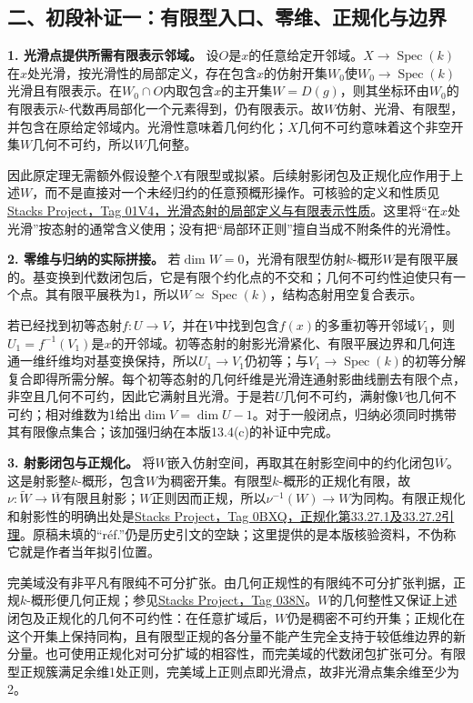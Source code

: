 \documentclass[UTF8,a4paper]{ctexbook}
\DeclareMathOperator{\Spec}{Spec}
\begin{document}
\subsection*{二、初段补证一：有限型入口、零维、正规化与边界}

\noindent\textbf{1. 光滑点提供所需有限表示邻域。}
设$O$是$x$的任意给定开邻域。$X\to\Spec(k)$在$x$处光滑，按光滑性的局部定义，存在包含$x$的仿射开集$W_0$使$W_0\to\Spec(k)$光滑且有限表示。在$W_0\cap O$内取包含$x$的主开集$W=D(g)$，则其坐标环由$W_0$的有限表示$k$-代数再局部化一个元素得到，仍有限表示。故$W$仿射、光滑、有限型，并包含在原给定邻域内。光滑性意味着几何约化；$X$几何不可约意味着这个非空开集$W$几何不可约，所以$W$几何整。

因此原定理无需额外假设整个$X$有限型或拟紧。后续射影闭包及正规化应作用于上述$W$，而不是直接对一个未经归约的任意预概形操作。可核验的定义和性质见\href{https://stacks.math.columbia.edu/tag/01V4}{Stacks Project，Tag 01V4，光滑态射的局部定义与有限表示性质}。这里将“在$x$处光滑”按态射的通常含义使用；没有把“局部环正则”擅自当成不附条件的光滑性。

\noindent\textbf{2. 零维与归纳的实际拼接。}
若$\dim W=0$，光滑有限型仿射$k$-概形$W$是有限平展的。基变换到代数闭包后，它是有限个约化点的不交和；几何不可约性迫使只有一个点。其有限平展秩为1，所以$W\simeq\Spec(k)$，结构态射用空复合表示。

若已经找到初等态射$f:U\to V$，并在$V$中找到包含$f(x)$的多重初等开邻域$V_1$，则$U_1=f^{-1}(V_1)$是$x$的开邻域。初等态射的射影光滑紧化、有限平展边界和几何连通一维纤维均对基变换保持，所以$U_1\to V_1$仍初等；与$V_1\to\Spec(k)$的初等分解复合即得所需分解。每个初等态射的几何纤维是光滑连通射影曲线删去有限个点，非空且几何不可约，因此它满射且光滑。于是若$U$几何不可约，满射像$V$也几何不可约；相对维数为1给出$\dim V=\dim U-1$。对于一般闭点，归纳必须同时携带其有限像点集合；该加强归纳在本版13.4(c)的补证中完成。

\noindent\textbf{3. 射影闭包与正规化。}
将$W$嵌入仿射空间，再取其在射影空间中的约化闭包$\overline W$。这是射影整$k$-概形，包含$W$为稠密开集。有限型$k$-概形的正规化有限，故$\nu:\widetilde W\to\overline W$有限且射影；$W$正则因而正规，所以$\nu^{-1}(W)\to W$为同构。有限正规化和射影性的明确出处是\href{https://stacks.math.columbia.edu/tag/0BXQ}{Stacks Project，Tag 0BXQ，正规化第33.27.1及33.27.2引理}。原稿未填的“r\'ef.”仍是历史引文的空缺；这里提供的是本版核验资料，不伪称它就是作者当年拟引位置。

完美域没有非平凡有限纯不可分扩张。由几何正规性的有限纯不可分扩张判据，正规$k$-概形便几何正规；参见\href{https://stacks.math.columbia.edu/tag/038N}{Stacks Project，Tag 038N}。$W$的几何整性又保证上述闭包及正规化的几何不可约性：在任意扩域后，$W$仍是稠密不可约开集；正规化在这个开集上保持同构，且有限型正规的各分量不能产生完全支持于较低维边界的新分量。也可使用正规化对可分扩域的相容性，而完美域的代数闭包扩张可分。有限型正规簇满足余维1处正则，完美域上正则点即光滑点，故非光滑点集余维至少为2。
\end{document}

